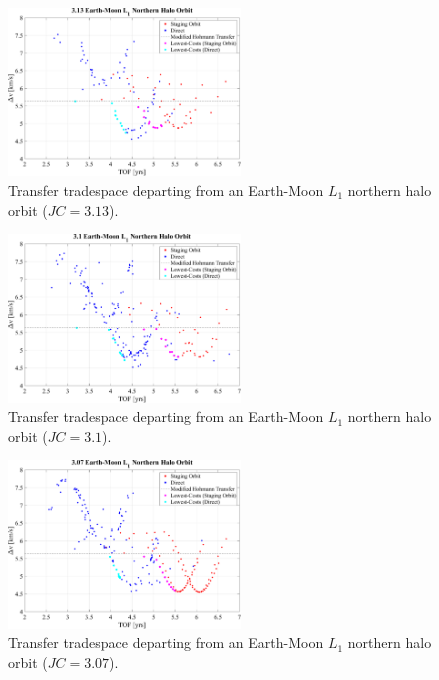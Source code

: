 \begin{figure}[ht]
    \centering
    \includegraphics[width=0.55\textwidth]{figures/TradeSpace_L1Halo_3_13.pdf}
    \caption{Transfer tradespace departing from an Earth-Moon $L_{1}$ northern halo orbit ($JC=3.13$).}
\end{figure}

\begin{figure}[ht]
    \centering
    \includegraphics[width=0.55\textwidth]{figures/TradeSpace_L1Halo_3_10.pdf}
    \caption{Transfer tradespace departing from an Earth-Moon $L_{1}$ northern halo orbit ($JC=3.1$).}
\end{figure}

\begin{figure}[ht]
    \centering
    \includegraphics[width=0.55\textwidth]{figures/TradeSpace_L1Halo_3_07.pdf}
    \caption{Transfer tradespace departing from an Earth-Moon $L_{1}$ northern halo orbit ($JC=3.07$).}
\end{figure}

